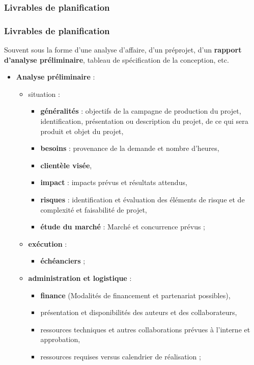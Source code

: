 \begin{frame}[allowframebreaks]
						
					\end{frame}

						\subsubsection{Livrables de planification} 
							\begin{frame}[allowframebreaks]
							\frametitle{Livrables de planification}
                        		Souvent sous la forme d'une analyse d’affaire, d'un préprojet, d'un \textbf{rapport d’analyse préliminaire}, tableau de spécification de la conception, etc.
	
							\begin{itemize}
							\framebreak
							\item \textbf{Analyse préliminaire} :
								\begin{itemize}
								\item situation :
									\begin{itemize}
									\item \textbf{généralités} : objectifs de la campagne de production du projet, identification, présentation ou description du projet, de ce qui sera produit et objet du projet, 
									\item \textbf{besoins }: provenance de la demande et nombre d’heures,
									\item \textbf{clientèle visée},
									\item \textbf{impact} : impacts prévus et résultats attendus,
									\item \textbf{risques }: identification et évaluation des éléments de risque et de complexité et faisabilité de projet,										
									\item \textbf{étude du marché} : Marché et concurrence prévus ;								
									\end{itemize}
								\framebreak
								\item \textbf{exécution} : 
									\begin{itemize}
									\item \textbf{échéanciers} ;
									\end{itemize}
								\item \textbf{administration et logistique} :
									\begin{itemize}
									\item \textbf{finance} (Modalités de financement et partenariat possibles),						
									\item présentation et disponibilités des auteurs et des collaborateurs,
									\item ressources techniques et autres collaborations prévues à l’interne et approbation,
									\item ressources requises versus calendrier de réalisation ;
									\end{itemize}
								\end{itemize}
							\framebreak
							

\end{itemize}
\end{frame}
